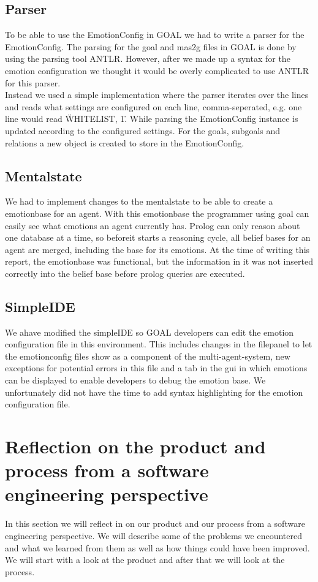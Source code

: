 \documentclass[11pt]{article}
\begin{document}
\subsection{Parser}
To be able to use the EmotionConfig in GOAL we had to write a parser for the EmotionConfig. The parsing for the goal and mas2g files in GOAL is done by using the parsing tool ANTLR. However, after we made up a syntax for the emotion configuration we thought it would be overly complicated to use ANTLR for this parser.\\
Instead we used a simple implementation where the parser iterates over the lines and reads what settings are configured on each line, comma-seperated, e.g. one line would read \"WHITELIST, 1\". While parsing the EmotionConfig instance is updated according to the configured settings. For the goals, subgoals and relations a new object is created to store in the EmotionConfig. 

\subsection{Mentalstate}
We had to implement changes to the mentalstate to be able to create a emotionbase for an agent. With this emotionbase the programmer using goal can easily see what emotions an agent currently has. Prolog can only reason about one database at a time, so beforeit starts a reasoning cycle, all belief bases for an agent are merged, including the base for its emotions. At the time of writing this report, the emotionbase was functional, but the information in it was not inserted correctly into the belief base before prolog queries are executed. 

\subsection{SimpleIDE}
We ahave modified the simpleIDE so GOAL developers can edit the emotion configuration file in this environment. This includes changes in the filepanel to let the emotionconfig files show as a component of the multi-agent-system\cite{GOAL Env}, new exceptions for potential errors in this file and a tab in the gui in which emotions can be displayed to enable developers to debug the emotion base. We unfortunately did not have the time to add syntax highlighting for the emotion configuration file. 

\clearpage

\section{Reflection on the product and process from a software engineering perspective}
In this section we will reflect in on our product and our process from a software engineering perspective. We will describe some of the problems we encountered and what we learned from them as well as how things could have been improved. We will start with a look at the product and after that we will look at the process.
\end{document}
